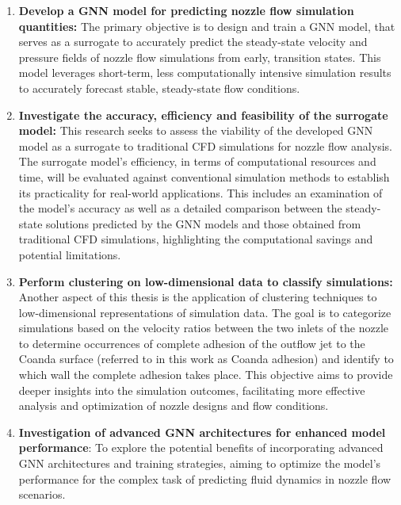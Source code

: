 \begin{enumerate}
\item \textbf{Develop a GNN model for predicting nozzle flow simulation quantities:} 
The primary objective is to design and train a GNN model, that serves as a surrogate to accurately predict the steady-state velocity and pressure fields of nozzle flow simulations from early, transition states. This model leverages short-term, less computationally intensive simulation results to accurately forecast stable, steady-state flow conditions.
\item \textbf{Investigate the accuracy, efficiency and feasibility of the surrogate model:} This research seeks to assess the viability of the developed GNN model as a surrogate to traditional CFD simulations for nozzle flow analysis. The surrogate model's efficiency, in terms of computational resources and time, will be evaluated against conventional simulation methods to establish its practicality for real-world applications.
This includes an examination of the model's accuracy as well as a detailed comparison between the steady-state solutions predicted by the GNN models and those obtained from traditional CFD simulations, highlighting the computational savings and potential limitations.
\item \textbf{Perform clustering on low-dimensional data to classify simulations:} Another aspect of this thesis is the application of clustering techniques to low-dimensional representations of simulation data. The goal is to categorize simulations based on the velocity ratios between the two inlets of the nozzle to determine occurrences of complete adhesion of the outflow jet to the Coanda surface (referred to in this work as Coanda adhesion) and identify to which wall the complete adhesion takes place. This objective aims to provide deeper insights into the simulation outcomes, facilitating more effective analysis and optimization of nozzle designs and flow conditions.
\item \textbf{Investigation of advanced GNN architectures for enhanced model performance}: To explore the potential benefits of incorporating advanced GNN architectures and training strategies, aiming to optimize the model's performance for the complex task of predicting fluid dynamics in nozzle flow scenarios.
\end{enumerate}
